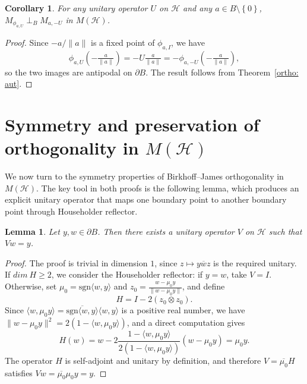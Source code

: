 \documentclass[12pt]{amsart}
\newtheorem{lemma}[theorem]{Lemma}
\newtheorem{corollary}[theorem]{Corollary}
\theoremstyle{definition}
\renewcommand{\H}{\mathcal{H}}
\begin{document}
\begin{corollary}
For any unitary operator $U$ on $\mathcal{H}$ and any 
$a \in B \setminus \left\{0\right\}$, $M_{\phi_{a,U}} \perp_B M_{a,-U}$ in 
$M(\mathcal{H})$.
\end{corollary}

\begin{proof}
Since $-a/\|a\|$ is a fixed point of $\phi_{a,I}$, we have
\[
\phi_{a,U}\!\left(-\tfrac{a}{\|a\|}\right) = -U\tfrac{a}{\|a\|} 
= -\phi_{a,-U}\!\left(-\tfrac{a}{\|a\|}\right),
\]
so the two images are antipodal on $\partial B$. The result follows 
from Theorem~\ref{ortho: aut}.
\end{proof}




\section{Symmetry and preservation of orthogonality in $M(\H)$}\label{section:preservation}

\noindent We now turn to the symmetry properties of 
Birkhoff--James orthogonality in $M(\mathcal{H})$. The key tool in both proofs is the following lemma, which produces an explicit unitary operator that maps one boundary point to another boundary point through Householder reflector.

\begin{lemma}\label{lem:householder}
Let $y, w \in \partial B$. Then there exists a unitary operator 
$V$ on $\mathcal{H}$ such that $Vw = y$.
\end{lemma}

\begin{proof}
The proof is trivial in dimension $1$, since $z\mapsto y\overline{w}z$ is the required unitary. If $dim~H\geq 2$, we consider the Householder reflector: if $y = w$, take $V = I$. Otherwise, set 
$\mu_0 = \mathrm{sgn}\langle w, y\rangle$ and 
$z_0 = \frac{w - \mu_0 y}{\|w - \mu_0 y\|}$, and define
\[
H = I - 2(z_0\otimes z_0).
\]
Since $\langle w, \mu_0 y\rangle = \overline{\mathrm{sgn}
\langle w,y\rangle}\langle w,y\rangle$ is a positive real 
number, we have $\|w - \mu_0 y\|^2 = 2(1 - \langle w, 
\mu_0 y\rangle)$, and a direct computation gives
\[
H(w) = w - 2\frac{1 - \langle w, \mu_0 y\rangle}
{2(1 - \langle w, \mu_0 y\rangle)}(w - \mu_0 y) = \mu_0 y.
\]
The operator $H$ is self-adjoint and unitary by definition, 
and therefore $V = \overline{\mu_0}H$ satisfies 
$Vw = \overline{\mu_0}\mu_0 y = y$.
\end{proof}
\end{document}
